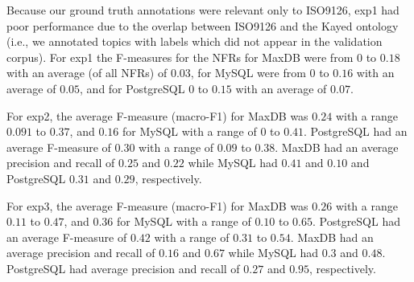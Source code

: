 \documentclass[smallextended]{svjour3}       %
\begin{document}
Because our ground truth annotations were relevant only to ISO9126,
 \textsf{exp1} had poor
performance due to the overlap between ISO9126 and the Kayed ontology (i.e., we annotated topics with labels which did not appear in the validation corpus). 
For \textsf{exp1} the F-measures for the NFRs for MaxDB were from $0$ to $0.18$ with an average (of all NFRs)
of $0.03$, for MySQL were from $0$ to $0.16$ with an average of
$0.05$, and for PostgreSQL $0$ to $0.15$ with an average of $0.07$. 




For \textsf{exp2}, the average F-measure (macro-F1) for MaxDB was  $0.24$ with a range $0.091$ to
$0.37$, and $0.16$ for MySQL with a range of $0$ to $0.41$. PostgreSQL had an average F-measure of $0.30$ %
 with a range of $0.09$ to $0.38$.
MaxDB had an average precision and recall of $0.25$ and $0.22$
while MySQL had $0.41$ and $0.10$ and PostgreSQL $0.31$ and $0.29$, respectively.

For \textsf{exp3}, the average F-measure (macro-F1) for MaxDB was $0.26$ with a range $0.11$ to
$0.47$, and $0.36$ for MySQL with a range of $0.10$ to $0.65$. 
PostgreSQL had an average F-measure of $0.42$ with a range of $0.31$ to $0.54$.
MaxDB had an average precision and recall of $0.16$ and $0.67$
while MySQL had $0.3$ and $0.48$. PostgreSQL had average precision and recall of $0.27$ and $0.95$, respectively.
\end{document}
